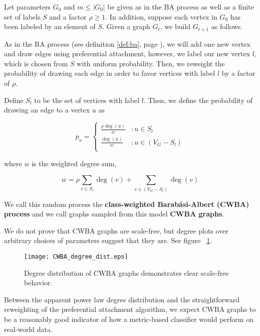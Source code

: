 \begin{definition}
  Let parameters $G_0$ and $m \leq |G_0|$ be given as in the BA process as well
  as a finite set of labels $S$ and a factor $\rho \ge 1$. In addition, suppose
  each vertex in $G_0$ has been labeled by an element of $S$. Given a graph
  $G_t$, we build $G_{t+1}$ as follows.

  As in the BA process (see definition \ref{def:ba}, page \pageref{def:ba}), we will add one new vertex and draw
  edges using preferential attachment, however, we label our new vertex $l$, which is chosen from $S$
  with uniform probability. Then, we reweight the probability of drawing each edge in order to favor
  vertices with label $l$ by a factor of $\rho$.

  Define $S_l$ to be the set of vertices with label $l$. Then, we define the
  probability of drawing an edge to a vertex $u$ as

  \[
    p_u = \begin{cases}
      \frac{\rho\deg(u)}{w} &: u \in S_l\\
      
      \frac{\deg(u)}{w} &: u \in (V_G - S_l)\\
    \end{cases}
  \]

  where $w$ is the weighted degree sum,

  \[
    w = \rho \sum_{v \in S_l}\deg(v) + \sum_{v \in (V_G - S_l)}\deg(v)
  \]

  We call this random process the \textbf{class-weighted Barab\'asi-Albert
    (CWBA) process} and we call graphs sampled from this model \textbf{CWBA
    graphs}.

\end{definition}

We do not prove that CWBA graphs are scale-free, but degree plots over arbitrary choices of
parameters suggest that they are. See figure ~\ref{fig:cwba_degs}.

\begin{figure}[H]
  \centering
  \texttt{[image: CWBA\_degree\_dist.eps]}
  \caption{Degree distribution of CWBA graphs demonstrates clear scale-free behavior.}
  \label{fig:cwba_degs}
\end{figure}

Between the apparent power law degree distribution and the straightforward reweighting of the
preferential attachment algorithm, we expect CWBA graphs to be a reasonably good indicator of how a
metric-based classifier would perform on real-world data.

